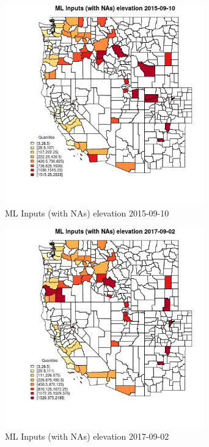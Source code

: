 \begin{figure} 
\centering  
\includegraphics[width=0.77\textwidth]{Code_Outputs/Report_ML_input_PM25_Step4_part_e_de_duplicated_aveswNAs_CountyelevationMean2015-09-10_2015-09-10.jpg} 
\caption{\label{fig:Report_ML_input_PM25_Step4_part_e_de_duplicated_aveswNAsCountyelevationMean2015-09-10_2015-09-10}ML Inputs (with NAs) elevation 2015-09-10} 
\end{figure} 
 

\begin{figure} 
\centering  
\includegraphics[width=0.77\textwidth]{Code_Outputs/Report_ML_input_PM25_Step4_part_e_de_duplicated_aveswNAs_CountyelevationMean2017-09-02_2017-09-02.jpg} 
\caption{\label{fig:Report_ML_input_PM25_Step4_part_e_de_duplicated_aveswNAsCountyelevationMean2017-09-02_2017-09-02}ML Inputs (with NAs) elevation 2017-09-02} 
\end{figure} 
 

